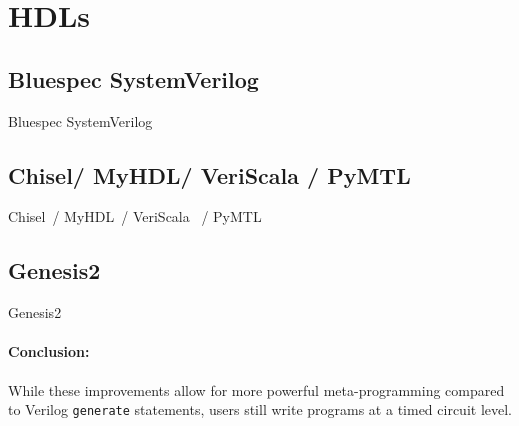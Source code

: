 \section{HDLs}
%
\subsection{Bluespec SystemVerilog}
Bluespec SystemVerilog~\cite{bluespec}
% 

\subsection{Chisel/ MyHDL/ VeriScala / PyMTL}
Chisel~\cite{bachrach_dac_2012_chisel}/ MyHDL~\cite{decaluwe_2004_myhdl}/ VeriScala~\cite{liu_2017_scala} / PyMTL~\cite{lockhart_ISCA_2014_pymtl}
%

\subsection{Genesis2}
Genesis2~\cite{genesis2}
%
\paragraph{Conclusion: } While these improvements allow for more powerful meta-programming compared to Verilog \texttt{\small{generate}} statements, users still write programs at a timed circuit level.




